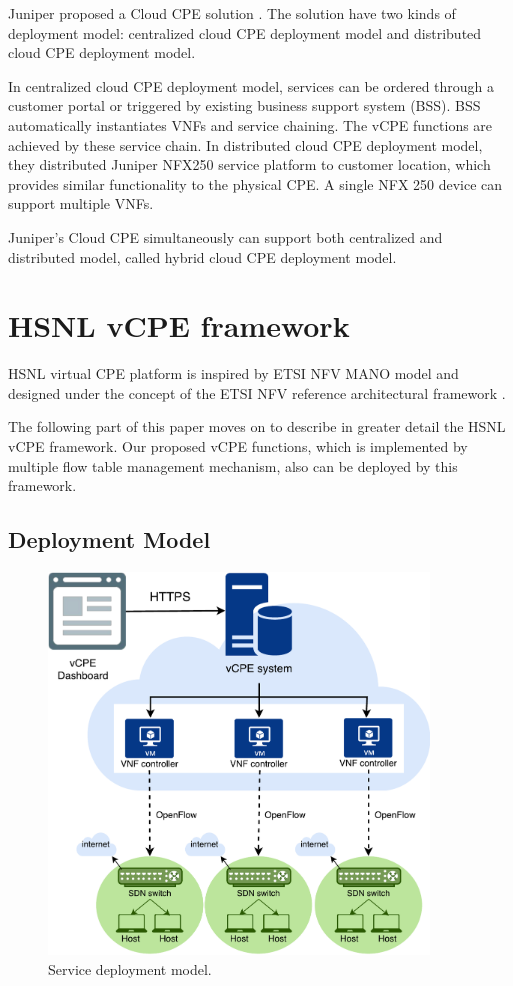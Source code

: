 Juniper proposed a Cloud CPE solution \cite{juniper-cpe}. The solution have two kinds of deployment model: centralized cloud CPE deployment model and distributed cloud CPE deployment model.

In centralized cloud CPE deployment model, services can be ordered through a customer portal or triggered by existing business support system (BSS). BSS automatically instantiates VNFs and service chaining. The vCPE functions are achieved by these service chain.
In distributed cloud CPE deployment model, they distributed Juniper NFX250 service platform to customer location, which provides similar functionality to the physical CPE. A single NFX 250 device can support multiple VNFs.

Juniper’s Cloud CPE simultaneously can support both centralized and distributed model, called hybrid cloud CPE deployment model.



\section{HSNL vCPE framework} \label{sec:hsnl_vcpe}


HSNL virtual CPE platform \cite{che-wei-master, che-wei-umedia} is inspired by ETSI NFV MANO model and designed under the concept of the ETSI NFV reference architectural framework \cite{etsi-nfv-archi}.

The following part of this paper moves on to describe in greater detail the HSNL vCPE framework. Our proposed vCPE functions, which is implemented by multiple flow table management mechanism, also can be deployed by this framework.


\subsection{Deployment Model}

\begin{figure}[!t]
\centering
\includegraphics[width=0.9\textwidth]{./fig/hsnl_service_deployment}
\caption{Service deployment model.}
\label{fig:hsnl_service_deployment}
\end{figure}

